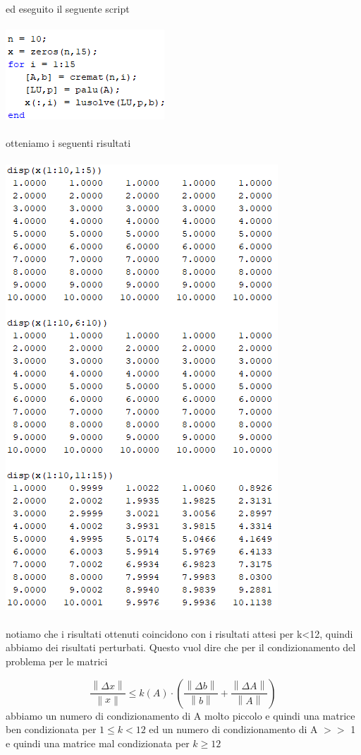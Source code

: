 ed eseguito il seguente script
\\~\\
\includegraphics[width=.5\linewidth]{img/ex10.png}
\\~\\
otteniamo i seguenti risultati
\\~\\
\includegraphics[width=.65\linewidth]{img/tabella10.png}\\~\\
notiamo che i risultati ottenuti coincidono con i risultati attesi per k<12, quindi abbiamo dei risultati perturbati.\newline
Questo vuol dire che per il condizionamento del problema per le matrici

\begin{equation}
	\frac{\left \| \Delta x \right \|}{\left \| x \right \|} \leq k(A)\cdot \left ( \frac{\left \| \Delta b \right \|}{\left \| b \right \|} + \frac{\left \| \Delta A \right \|}{\left \| A \right \|}\right )
\end{equation}
abbiamo un numero di condizionamento di A molto piccolo e quindi una matrice ben condizionata per $1 \leq k<12$ ed un numero di condizionamento di A $>>$ 1 e quindi una matrice mal condizionata per $k \geq 12$